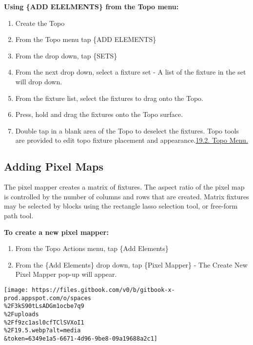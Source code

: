 \documentclass[
]{article}
\begin{document}
\textbf{Using \{ADD ELELMENTS\} from the Topo menu:}

\begin{enumerate}
\def\labelenumi{\arabic{enumi}.}
\item
  Create the Topo
\item
  From the Topo menu tap \{ADD ELEMENTS\}
\item
  From the drop down, tap \{SETS\}
\item
  From the next drop down, select a fixture set - A list of the fixture in the set will drop down.
\item
  From the fixture list, select the fixtures to drag onto the Topo.
\item
  Press, hold and drag the fixtures onto the Topo surface.
\item
  Double tap in a blank area of the Topo to deselect the fixtures. Topo tools are provided to edit topo fixture placement and appearance.\href{https://vibemanual.compulite.com/topo-topographical-display.html\#topo-menu}{19.2. Topo Menu.}
\end{enumerate}

\hypertarget{adding-pixel-maps}{%
\subsection{Adding Pixel Maps}\label{adding-pixel-maps}}

The pixel mapper creates a matrix of fixtures. The aspect ratio of the pixel map is controlled by the number of columns and rows that are created. Matrix fixtures may be selected by blocks using the rectangle lasso selection tool, or free-form path tool.

\textbf{To create a new pixel mapper:}

\begin{enumerate}
\def\labelenumi{\arabic{enumi}.}
\item
  From the Topo Actions menu, tap \{Add Elements\}
\item
  From the \{Add Elements\} drop down, tap \{Pixel Mapper\} - The Create New Pixel Mapper pop-up will appear.
\end{enumerate}

\texttt{[image: https://files.gitbook.com/v0/b/gitbook-x-prod.appspot.com/o/spaces\\\%2F3kS90tLsADGm1ocbe7q9\\\%2Fuploads\\\%2Ff9zc1asl0cfTClSVXoI1\\\%2F19.5.webp?alt=media\\\&token=6349e1a5-6671-4d96-9be8-09a19688a2c1]}
\end{document}
